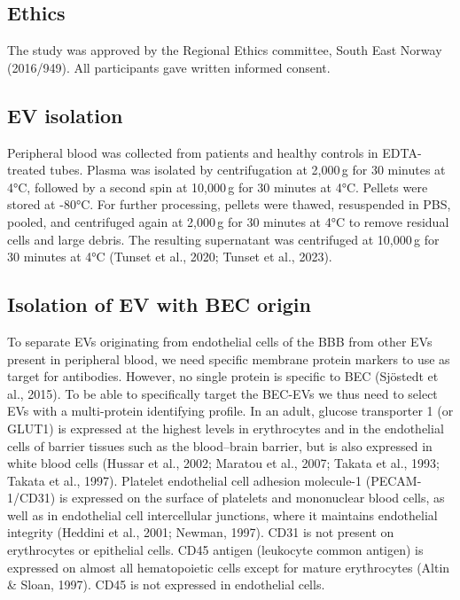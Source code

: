 \documentclass[authordate, empirical]{jote-new-article}
\begin{document}
	\subsection{Ethics}



	The study was approved by the Regional Ethics committee, South East Norway (2016/949). All participants gave written informed consent.







	\subsection{EV isolation}



	Peripheral blood was collected from patients and healthy controls in EDTA-treated tubes. Plasma was isolated by centrifugation at 2,000 g for 30 minutes at 4°C, followed by a second spin at 10,000 g for 30 minutes at 4°C. Pellets were stored at -80°C. For further processing, pellets were thawed, resuspended in PBS, pooled, and centrifuged again at 2,000 g for 30 minutes at 4°C to remove residual cells and large debris. The resulting supernatant was centrifuged at 10,000 g for 30 minutes at 4°C (Tunset et al., 2020; Tunset et al., 2023).







	\subsection{Isolation of EV with BEC origin }



	To separate EVs originating from endothelial cells of the BBB from other EVs present in peripheral blood, we need specific membrane protein markers to use as target for antibodies. However, no single protein is specific to BEC (Sjöstedt et al., 2015). To be able to specifically target the BEC-EVs we thus need to select EVs with a multi-protein identifying profile. In an adult, glucose transporter 1 (or GLUT1) is expressed at the highest levels in erythrocytes and in the endothelial cells of barrier tissues such as the blood--brain barrier, but is also expressed in white blood cells (Hussar et al., 2002; Maratou et al., 2007; Takata et al., 1993; Takata et al., 1997). Platelet endothelial cell adhesion molecule-1 (PECAM-1/CD31) is expressed on the surface of platelets and mononuclear blood cells, as well as in endothelial cell intercellular junctions, where it maintains endothelial integrity (Heddini et al., 2001; Newman, 1997). CD31 is not present on erythrocytes or epithelial cells. CD45 antigen (leukocyte common antigen) is expressed on almost all hematopoietic cells except for mature erythrocytes (Altin \& Sloan, 1997). CD45 is not expressed in endothelial cells.
\end{document}
